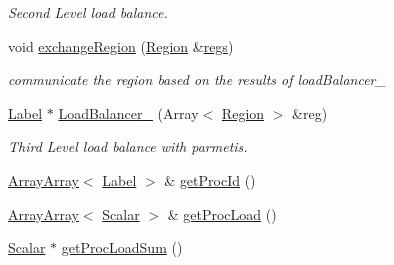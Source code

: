 \begin{DoxyCompactItemize}
\begin{DoxyCompactList}\small\item\em Second Level load balance. \item\end{DoxyCompactList}\item 
void \hyperlink{classHSF_1_1LoadBalancer_aff34a6877828f65b92b9e146eaaced3b}{exchangeRegion} (\hyperlink{classHSF_1_1Region}{Region} \&\hyperlink{src_2interfaces_2interface_8hpp_aeb8610dbeef683c2abea70a1362a2d25}{regs})
\begin{DoxyCompactList}\small\item\em communicate the region based on the results of loadBalancer\_ \item\end{DoxyCompactList}\item 
\hyperlink{namespaceHSF_ae65d72be782e989396ebe5ec6ae4c2b6}{Label} $\ast$ \hyperlink{classHSF_1_1LoadBalancer_a9c6357abc32209101f62d07846cf8cff}{LoadBalancer\_} (Array$<$ \hyperlink{classHSF_1_1Region}{Region} $>$ \&reg)
\begin{DoxyCompactList}\small\item\em Third Level load balance with parmetis. \item\end{DoxyCompactList}\item 
\hyperlink{classHSF_1_1ArrayArray}{ArrayArray}$<$ \hyperlink{namespaceHSF_ae65d72be782e989396ebe5ec6ae4c2b6}{Label} $>$ \& \hyperlink{classHSF_1_1LoadBalancer_a934f19588ae53f8f2133ddb0af955e15}{getProcId} ()
\item 
\hyperlink{classHSF_1_1ArrayArray}{ArrayArray}$<$ \hyperlink{namespaceHSF_a7419497552ed1c5631a818b75eed1aec}{Scalar} $>$ \& \hyperlink{classHSF_1_1LoadBalancer_a969ba490fb82cdb116643d670b8c66b2}{getProcLoad} ()
\item 
\hyperlink{namespaceHSF_a7419497552ed1c5631a818b75eed1aec}{Scalar} $\ast$ \hyperlink{classHSF_1_1LoadBalancer_ad25ef85b3641df45c4f62a5dccf15454}{getProcLoadSum} ()
\end{DoxyCompactItemize}
